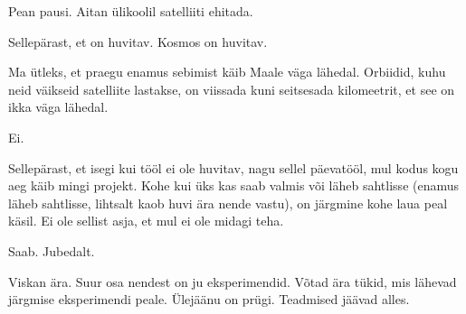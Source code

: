
Pean pausi. Aitan ülikoolil satelliiti ehitada. 


Sellepärast, et on huvitav. Kosmos on huvitav.


Ma ütleks, et praegu enamus sebimist käib Maale väga lähedal. Orbiidid, kuhu neid väikseid satelliite lastakse, on viissada kuni seitsesada kilomeetrit, et see on ikka väga lähedal.


Ei.


Sellepärast, et isegi kui tööl ei ole  huvitav, nagu sellel päevatööl, mul kodus kogu aeg käib mingi projekt. Kohe kui üks kas saab valmis või läheb sahtlisse (enamus läheb sahtlisse, lihtsalt kaob huvi ära nende vastu), on järgmine kohe laua peal käsil. Ei ole sellist asja, et mul ei ole midagi teha.


Saab. Jubedalt. 


Viskan ära. Suur osa nendest on ju eksperimendid. Võtad ära tükid, mis lähevad  järgmise eksperimendi peale. Ülejäänu on prügi. Teadmised jäävad alles.
